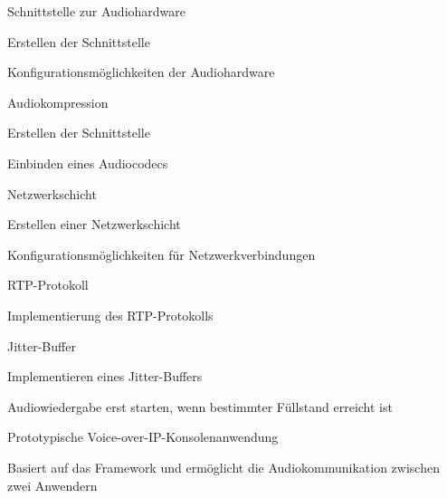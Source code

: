\begin{compactenum}[a)]
	\item Schnittstelle zur Audiohardware \label{FA:SchnittstelleAudiohardware}
		\begin{compactenum}[1.]
			\item Erstellen der Schnittstelle \label{FA:SchnittstelleAudiohardware:Erstellen}
			\item Konfigurationsmöglichkeiten der Audiohardware \label{FA:SchnittstelleAudiohardware:Konfigurieren}
		\end{compactenum}
	\item Audiokompression \label{FA:Audiokompression}
		\begin{compactenum}[1.]
			\item Erstellen der Schnittstelle \label{Fa:Audiokompression:Erstellen}
			\item Einbinden eines Audiocodecs \label{Fa:Audiokompression:CodecEinbinden}
		\end{compactenum}
	\item Netzwerkschicht \label{Fa:Netzwerkschicht}
		\begin{compactenum}[1.]
			\item Erstellen einer Netzwerkschicht \label{Fa:Netzwerkschicht:Erstellen}
			\item Konfigurationsmöglichkeiten für Netzwerkverbindungen \label{FA:Netzwerkschicht:Konfigurieren}
		\end{compactenum}
	\item RTP-Protokoll \label{FA:RTP}
		\begin{compactenum}[1.]
			\item Implementierung des RTP-Protokolls \label{FA:RTP:Implementieren}
		\end{compactenum}
	\item Jitter-Buffer \label{FA:Jitter-Buffer}
		\begin{compactenum}[1.]
			\item Implementieren eines Jitter-Buffers \label{FA:Jitter-Buffer:Implementieren}
			\item Audiowiedergabe erst starten, wenn bestimmter Füllstand erreicht ist \label{FA:Jitter-Buffer:Buffern}
		\end{compactenum}
	\item Prototypische Voice-over-IP-Konsolenanwendung \label{FA:Konsolenanwendung}
		\begin{compactenum}[1.]
			\item Basiert auf das Framework und ermöglicht die Audiokommunikation zwischen zwei Anwendern \label{FA:Konsolenanwendung:Audiokommunikation}

\end{compactenum}
\end{compactenum}
